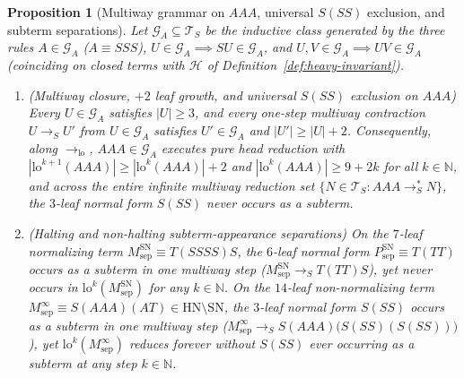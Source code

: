 \documentclass[11pt,reqno]{amsart}
\numberwithin{equation}{section}
\theoremstyle{plain}
\newtheorem{proposition}[theorem]{Proposition}
\theoremstyle{definition}
\theoremstyle{remark}
\newcommand{\TS}{\mathcal{T}_S}
\newcommand{\SN}{\mathrm{SN}}
\newcommand{\HN}{\mathrm{HN}}
\newcommand{\redS}{\to_S}
\newcommand{\redSs}{\to_S^*}
\begin{document}
\begin{proposition}[Multiway grammar on $A A A$, universal $S(S S)$ exclusion, and subterm separations]
\label{prop:aaa-grammar-and-subterm-sep}
Let $\mathcal{G}_A \subseteq \TS$ be the inductive class generated by the three rules $A \in \mathcal{G}_A$ ($A \equiv S S S$), $U \in \mathcal{G}_A \implies S U \in \mathcal{G}_A$, and $U, V \in \mathcal{G}_A \implies U V \in \mathcal{G}_A$ (coinciding on closed terms with $\mathcal{H}$ of Definition~\ref{def:heavy-invariant}).
\begin{enumerate}[label=(\roman*),leftmargin=2.2em]
\item \emph{(Multiway closure, $+2$ leaf growth, and universal $S(S S)$ exclusion on $A A A$)} Every $U \in \mathcal{G}_A$ satisfies $|U| \ge 3$, and every one-step multiway contraction $U \redS U'$ from $U \in \mathcal{G}_A$ satisfies $U' \in \mathcal{G}_A$ and $|U'| \ge |U| + 2$. Consequently, along $\to_{\mathrm{lo}}$, $A A A \in \mathcal{G}_A$ executes pure head reduction with $|\mathrm{lo}^{k+1}(A A A)| \ge |\mathrm{lo}^k(A A A)| + 2$ and $|\mathrm{lo}^k(A A A)| \ge 9 + 2k$ for all $k \in \mathbb{N}$, and across the entire infinite multiway reduction set $\{ N \in \TS : A A A \redSs N \}$, the $3$-leaf normal form $S(S S)$ never occurs as a subterm.
\item \emph{(Halting and non-halting subterm-appearance separations)} On the $7$-leaf normalizing term $M_{\mathrm{sep}}^{\SN} \equiv T(S S S S)S$, the $6$-leaf normal form $P_{\mathrm{sep}}^{\SN} \equiv T(T T)$ occurs as a subterm in one multiway step ($M_{\mathrm{sep}}^{\SN} \redS T(T T)S$), yet never occurs in $\mathrm{lo}^k(M_{\mathrm{sep}}^{\SN})$ for any $k \in \mathbb{N}$. On the $14$-leaf non-normalizing term $M_{\mathrm{sep}}^{\infty} \equiv S(A A A)(A T) \in \HN \setminus \SN$, the $3$-leaf normal form $S(S S)$ occurs as a subterm in one multiway step ($M_{\mathrm{sep}}^{\infty} \redS S(A A A)\bigl(S(S S)(S(S S))\bigr)$), yet $\mathrm{lo}^k(M_{\mathrm{sep}}^{\infty})$ reduces forever without $S(S S)$ ever occurring as a subterm at any step $k \in \mathbb{N}$.
\end{enumerate}
\end{proposition}
\end{document}
